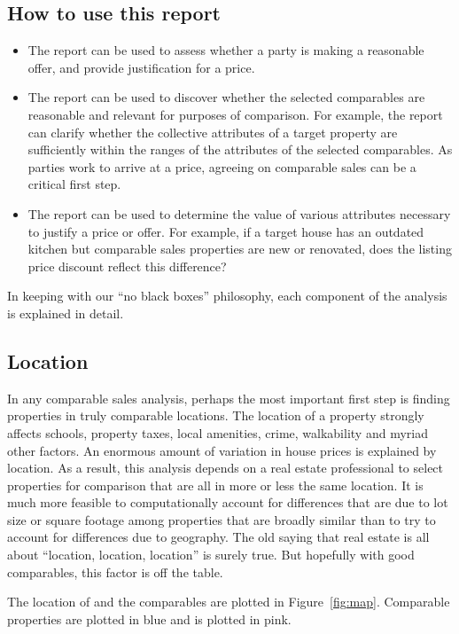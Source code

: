 \documentclass[
12pt, %
letterpaper, %
oneside, %
headinclude,footinclude, %
BCOR5mm, %
]{scrartcl}
\begin{document}
\subsection{How to use this report}
\begin{itemize}
\item The report can be used to assess whether a party is making a reasonable offer, and provide justification for a price. 
\item The report can be used to discover whether the selected comparables are reasonable and relevant for purposes of comparison. 
For example, the report can clarify whether the collective attributes of a target property are sufficiently within the ranges of the attributes of the selected comparables. As parties work to arrive at a price, agreeing on comparable sales can be a critical first step. 
\item The report can be used to determine the value of various attributes necessary to justify a price or offer. For example, if a target house has an outdated kitchen but comparable sales properties are new or renovated, does the listing price discount reflect this difference? 
\end{itemize} 

In keeping with our ``no black boxes'' philosophy, each component of the analysis is explained in detail. 

\subsection{Location}
In any comparable sales analysis, perhaps the most important first step is finding properties in truly comparable locations.
The location of a property strongly affects schools, property taxes, local amenities, crime, walkability and myriad other factors.
An enormous amount of variation in house prices is explained by location. 
As a result, this analysis depends on a real estate professional to select properties for comparison that are all in more or less the same location.
It is much more feasible to computationally account for differences that are due to lot size or square footage among properties that are broadly similar than to try to account for differences due to geography. 
The old saying that real estate is all about ``location, location, location'' is surely true. But hopefully with good comparables, this factor is off the table.

The location of \PropertyName{} and the comparables are plotted in Figure~\ref{fig:map}.
Comparable properties are plotted in blue and \PropertyName{} is plotted in pink. 
\end{document}
